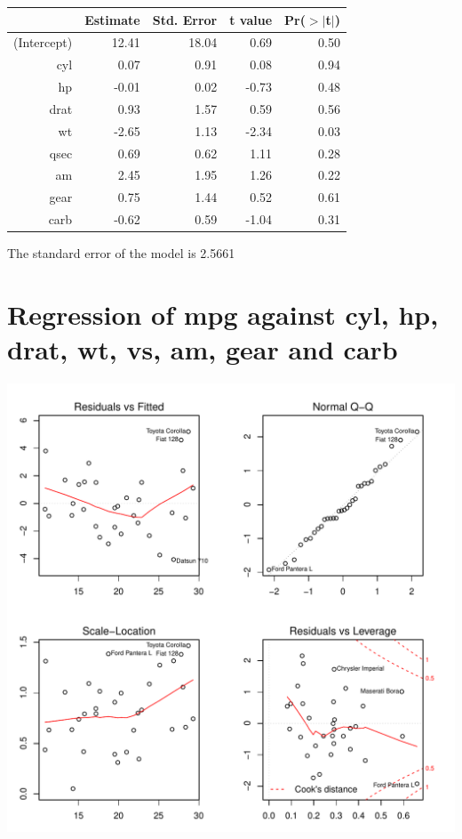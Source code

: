 \documentclass{article}\usepackage[]{graphicx}\usepackage[]{color}
\makeatletter
\def\maxwidth{ %
  \ifdim\Gin@nat@width>\linewidth
    \linewidth
  \else
    \Gin@nat@width
  \fi
}
\newenvironment{knitrout}{}{} %
\makeatother
\begin{document}
\begin{table}[ht]
\centering
\begin{tabular}{rrrrr}
  \hline
 & Estimate & Std. Error & t value & Pr($>$$|$t$|$) \\ 
  \hline
(Intercept) & 12.41 & 18.04 & 0.69 & 0.50 \\ 
  cyl & 0.07 & 0.91 & 0.08 & 0.94 \\ 
  hp & -0.01 & 0.02 & -0.73 & 0.48 \\ 
  drat & 0.93 & 1.57 & 0.59 & 0.56 \\ 
  wt & -2.65 & 1.13 & -2.34 & 0.03 \\ 
  qsec & 0.69 & 0.62 & 1.11 & 0.28 \\ 
  am & 2.45 & 1.95 & 1.26 & 0.22 \\ 
  gear & 0.75 & 1.44 & 0.52 & 0.61 \\ 
  carb & -0.62 & 0.59 & -1.04 & 0.31 \\ 
   \hline
\end{tabular}
\end{table}




The standard error of the model is 2.5661

\newpage

\section{Regression of mpg against cyl, hp, drat, wt, vs, am, gear and carb }
\begin{knitrout}
\color{fgcolor}

{\centering \includegraphics[width=\maxwidth]{figure/lm-cyl-hp-drat-wt-vs-am-gear-carb} 

}



\end{knitrout}
\end{document}
